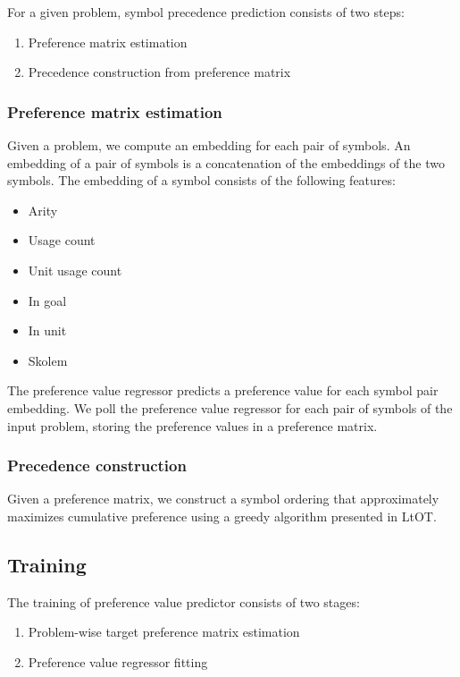 For a given problem, symbol precedence prediction consists of two steps:

\begin{enumerate}
	\item Preference matrix estimation
	\item Precedence construction from preference matrix
\end{enumerate}

\subsubsection{Preference matrix estimation}

Given a problem, we compute an embedding for each pair of symbols.
An embedding of a pair of symbols is a concatenation of the embeddings of the two symbols.
The embedding of a symbol consists of the following features:

\begin{itemize}
	\item Arity
	\item Usage count
	\item Unit usage count
	\item In goal
	\item In unit
	\item Skolem
\end{itemize}

The preference value regressor predicts a preference value for each symbol pair embedding.
We poll the preference value regressor for each pair of symbols of the input problem,
storing the preference values in a preference matrix.

\subsubsection{Precedence construction}

Given a preference matrix, we construct a symbol ordering
that approximately maximizes cumulative preference
using a greedy algorithm presented in LtOT.

\subsection{Training}

The training of preference value predictor consists of two stages:

\begin{enumerate}
	\item Problem-wise target preference matrix estimation
	\item Preference value regressor fitting
\end{enumerate}

